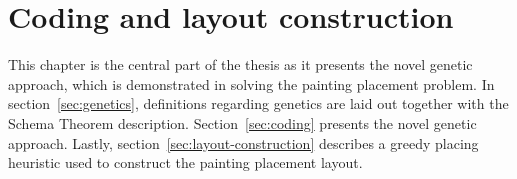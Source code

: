 \chapter{Coding and layout construction}\label{ch:coding-and-layout-construction}

This chapter is the central part of the thesis
as it presents the novel genetic approach, which is demonstrated in solving the painting placement problem.
In section~\ref{sec:genetics}, definitions regarding genetics are laid out together with the Schema Theorem description.
Section~\ref{sec:coding} presents the novel genetic approach.
Lastly, section~\ref{sec:layout-construction} describes a greedy placing heuristic
used to construct the painting placement layout.





